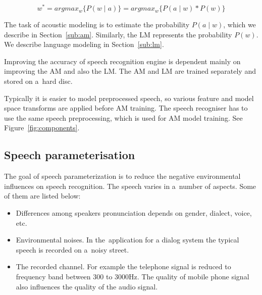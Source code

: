 \begin{equation}\label{eq:best_fix}
    w^* = argmax_{w}\{P(w \mid a)\} = argmax_{w}\{P(a \mid w) * P(w)\}
\end{equation}

The task of acoustic modeling is to estimate the probability $P(a \mid w)$, which we describe in Section~\ref{sub:am}. 
Similarly, the \ac{LM} represents the probability $P(w)$.
We describe language modeling in Section~\ref{sub:lm}.

Improving the accuracy of speech recognition engine is dependent mainly on improving the \ac{AM} and also the \ac{LM}.
The \ac{AM} and \ac{LM} are trained separately and stored on a~hard disc.

Typically it is easier to model preprocessed speech, so various feature and model space transforms are applied before \ac{AM} training.
The speech recogniser has to use the same speech preprocessing, which is used for \ac{AM} model training.
See Figure~\ref{fig:components}.


% 


\subsection{Speech parameterisation}
\label{sub:param}
The goal of speech parameterization is to reduce the negative environmental influences on speech recognition.
The speech varies in a~number of aspects. Some of them are listed below:
\begin{itemize}
    \item Differences among speakers pronunciation depends on gender, dialect, voice, etc.
    \item Environmental noises. In the~application for a dialog system the typical speech is
        recorded on a~noisy street. 
    \item The recorded channel. 
        For example the telephone signal is reduced to frequency band between 300 to 3000Hz.
        The quality of mobile phone signal also influences the quality of the audio signal.
\end{itemize}

